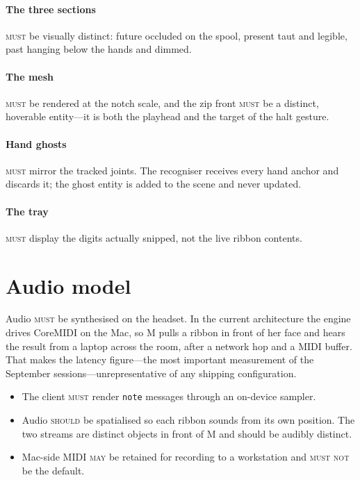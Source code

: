 \documentclass[11pt,a4paper]{article}
\newcommand{\MUST}{\textsc{must}}
\newcommand{\MUSTNOT}{\textsc{must not}}
\newcommand{\SHOULD}{\textsc{should}}
\newcommand{\MAY}{\textsc{may}}
\theoremstyle{definition}
\theoremstyle{plain}
\theoremstyle{remark}
\begin{document}
\paragraph{The three sections} \MUST{} be visually distinct: future occluded on the spool, present
taut and legible, past hanging below the hands and dimmed.

\paragraph{The mesh} \MUST{} be rendered at the notch scale, and the zip front \MUST{} be a
distinct, hoverable entity---it is both the playhead and the target of the halt gesture.

\paragraph{Hand ghosts} \MUST{} mirror the tracked joints. The recogniser receives every hand anchor
and discards it; the ghost entity is added to the scene and never updated.

\paragraph{The tray} \MUST{} display the digits actually snipped, not the live ribbon contents.

\section{Audio model}

Audio \MUST{} be synthesised on the headset. In the current architecture the engine drives CoreMIDI
on the Mac, so M pulls a ribbon in front of her face and hears the result from a laptop across the
room, after a network hop and a MIDI buffer. That makes the latency figure---the most important
measurement of the September sessions---unrepresentative of any shipping configuration.

\begin{itemize}[leftmargin=*]
\item The client \MUST{} render \texttt{note} messages through an on-device sampler.
\item Audio \SHOULD{} be spatialised so each ribbon sounds from its own position. The two streams
      are distinct objects in front of M and should be audibly distinct.
\item Mac-side MIDI \MAY{} be retained for recording to a workstation and \MUSTNOT{} be the default.
\end{itemize}
\end{document}
